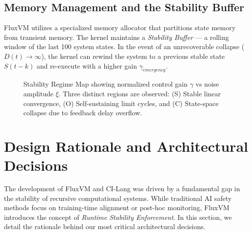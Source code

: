 \documentclass{article}
\begin{document}
\subsection{Memory Management and the Stability Buffer}
FluxVM utilizes a specialized memory allocator that partitions state memory from transient memory. The kernel maintains a \textit{Stability Buffer} — a rolling window of the last 100 system states. In the event of an unrecoverable collapse ($D(t) \to \infty$), the kernel can rewind the system to a previous stable state $S(t-k)$ and re-execute with a higher gain $\gamma_{emergency}$.

\begin{figure}[ht]
\centering
{}
\caption{Stability Regime Map showing normalized control gain $\gamma$ vs noise amplitude $\xi$. Three distinct regions are observed: (S) Stable linear convergence, (O) Self-sustaining limit cycles, and (C) State-space collapse due to feedback delay overflow.}
\label{fig:stability_map}
\end{figure}

\newpage

\section{Design Rationale and Architectural Decisions}
\label{sec:design_rationale}

The development of FluxVM and CI-Lang was driven by a fundamental gap in the stability of recursive computational systems. While traditional AI safety methods focus on training-time alignment or post-hoc monitoring, FluxVM introduces the concept of \textit{Runtime Stability Enforcement}. In this section, we detail the rationale behind our most critical architectural decisions.
\end{document}

